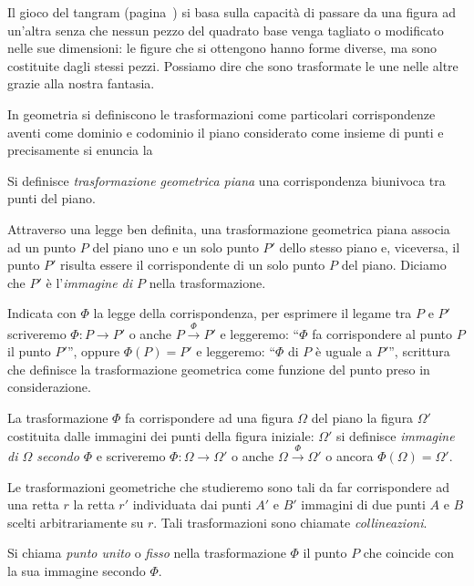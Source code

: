 Il gioco del tangram (pagina~\pageref{tangram}) si basa sulla capacità di passare da una figura ad un'altra senza che nessun pezzo del quadrato base venga tagliato o modificato nelle sue dimensioni: le figure che si ottengono hanno forme diverse, ma sono costituite dagli stessi pezzi. Possiamo dire che sono trasformate le une nelle altre grazie alla nostra fantasia.
 
In geometria si definiscono le trasformazioni come particolari corrispondenze aventi come dominio e codominio il piano considerato come insieme di punti e precisamente si enuncia la

\begin{definizione}
Si definisce \emph{trasformazione geometrica piana} una corrispondenza biunivoca tra punti del piano.
\end{definizione}

Attraverso una legge ben definita, una trasformazione geometrica piana associa ad un punto $P$ del piano uno e un solo punto $P'$ dello stesso piano e, viceversa, il punto $P'$ risulta essere il corrispondente di un solo punto $P$ del piano. Diciamo che $P'$ è l'\emph{immagine di $P$} nella trasformazione.

Indicata con $\Phi$ la legge della corrispondenza, per esprimere il legame tra $P$ e $P'$ scriveremo $\Phi:P\rightarrow P'$ o anche $P\overset{\Phi}{\rightarrow}P'$ e leggeremo: ``$\Phi$ fa corrispondere al punto $P$ il punto $P'$'', oppure $\Phi(P)=P'$ e leggeremo: ``$\Phi$ di $P$ è uguale a $P'$'', scrittura che definisce la trasformazione geometrica come funzione del punto preso in considerazione.

\begin{definizione}
La trasformazione $\Phi$ fa corrispondere ad una figura $\Omega$ del piano la figura $\Omega'$ costituita dalle immagini dei punti della figura iniziale: $\Omega'$ si definisce \emph{immagine di $\Omega$ secondo $\Phi$} e scriveremo $\Phi: \Omega \rightarrow \Omega'$ o anche $\Omega\overset{\Phi}{\rightarrow}\Omega'$ o ancora $\Phi(\Omega)=\Omega'$.
\end{definizione}

Le trasformazioni geometriche che studieremo sono tali da far corrispondere ad una retta $r$ la retta $r'$ individuata dai punti $A'$ e $B'$ immagini di due punti $A$ e $B$ scelti arbitrariamente su $r$. Tali trasformazioni sono chiamate \emph{collineazioni}.

\begin{definizione}
Si chiama \emph{punto unito} o \emph{fisso} nella trasformazione $\Phi$ il punto $P$ che coincide con la sua immagine secondo $\Phi$.
\end{definizione}

